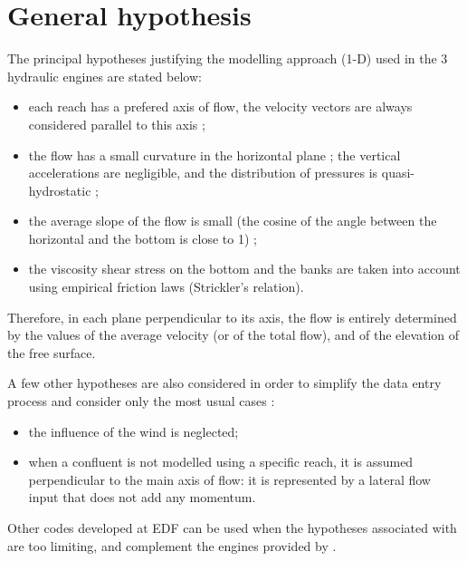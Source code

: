 \section{General hypothesis}

The principal hypotheses justifying the modelling approach (1-D) used in the 3
hydraulic engines are stated below:

\begin{itemize}
 \item each reach has a prefered axis of flow, the velocity vectors are always
   considered parallel to this axis ;
 \item the flow has a small curvature in the horizontal plane ; the vertical
   accelerations are negligible, and the distribution of pressures is
   quasi-hydrostatic ;
 \item the average slope of the flow is small (the cosine of the angle between
   the horizontal and the bottom is close to 1) ;
 \item the viscosity shear stress on the bottom and the banks are taken into
   account using empirical friction laws (Strickler's relation).
\end{itemize}

Therefore, in each plane perpendicular to its axis, the flow is entirely determined by the values of the average velocity (or of the total flow), and of the elevation of the free surface.

A few other hypotheses are also considered in order to simplify the data entry process and consider only the most usual cases :

\begin{itemize}
 \item the influence of the wind is neglected;
 \item when a confluent is not modelled using a specific reach, it is assumed perpendicular to the main axis of flow: it is represented by a lateral flow input that does not add any momentum.
\end{itemize}

Other codes developed at EDF can be used when the hypotheses associated with \mascaret{} are too limiting, and complement the engines provided by \mascaret{}.

